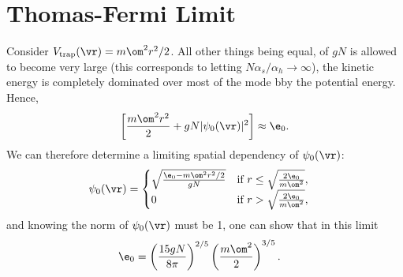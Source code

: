 \documentclass[qo.tex]{subfiles}
\begin{document}
\section{Thomas-Fermi Limit}
Consider $V_{\text{trap}}(\vr) = m\om^2r^2/2$.
All other things being equal, of $gN$ is allowed to become very large (this corresponds to letting $N\alpha_s/\alpha_h\to\infty$), the kinetic energy is completely dominated over most of the mode bby the potential energy. 
Hence,
\begin{align}
    \left[\frac{m\om^2r^2}{2}+gN|\psi_0(\vr)|^2\right]\approx \e_0.
\end{align}
We can therefore determine a limiting spatial dependency of $\psi_0(\vr)$:
\begin{align}
    \psi_0(\vr) &= \begin{cases} \sqrt{\frac{\e_0-m\om^2r^2/2}{gN}} & \text{if } r\leq\sqrt{\frac{2\e_0}{m\om^2}}, \\ 0 & \text{if } r > \sqrt{\frac{2\e_0}{m\om^2}}, \end{cases}
\end{align}
and knowing the norm of $\psi_0(\vr)$ must be 1, one can show that in this limit
\begin{align}
    \e_0 &= \left(\frac{15gN}{8\pi}\right)^{2/5}\left(\frac{m\om^2}{2}\right)^{3/5}.
\end{align}
\end{document}
